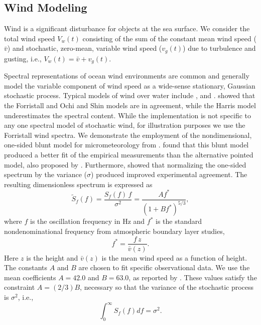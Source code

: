 \documentclass[utf8]{frontiersSCNS} %
\begin{document}
\subsection{Wind Modeling}\label{s:wind_model}
Wind is a significant disturbance for objects at the sea surface. We consider the total wind speed $V_w(t)$ consisting of the sum of the constant mean wind speed ($\bar{v}$) and stochastic, zero-mean, variable wind speed ($v_g(t)$) due to turbulence and gusting, i.e., $V_w(t)=\bar{v}+v_g(t)$.

Spectral representations of ocean wind environments are common and generally model the variable component of wind speed as a wide-sense stationary, Gaussian stochastic process.  Typical models of wind over water include \citet{harris71nature}, \citet{forristall88wind} and \citet{ochi13wind}. \citet{cole18reactive} showed that the Forristall and Ochi and Shin models are in agreement, while the Harris model underestimates the spectral content.  While the implementation is not specific to any one spectral model of stochastic wind, for illustration purposes we use the Forristall wind spectra.  \color{blue}We demonstrate the employment of the nondimensional, one-sided blunt model for micrometeorology from \citet{olesen84modelling}.  \citet{forristall88wind} found that this blunt model produced a better fit of the empirical measurements than the alternative pointed model, also proposed by \citet{olesen84modelling}.  Furthermore, \citet{forristall88wind} showed that normalizing the one-sided spectrum by the variance ($\sigma$) produced improved experimental agreement.  The resulting dimensionless spectrum is expressed as 
\begin{equation}
  \widetilde{S}_f(f) = \frac{S_f(f)\,f}{\sigma^2}  = \frac{ A f^*}{( 1 + B f^*)^{5/3}},
    \label{e:forristall}
    \end{equation}
\color{black}where $f$ is the oscillation frequency in \unit[]{Hz} and $f^*$ is the standard nondenominational frequency from atmospheric boundary layer studies,
\begin{equation}
  f^* = \frac{f \, z}{\bar{v}(z)}.
\end{equation}
Here $z$ is the height and $\bar{v}(z)$ is the mean wind speed as a function of height. The constants $A$ and $B$ are chosen to fit specific observational data.  We use the mean coefficients $A=42.0$ and $B=63.0$, as reported by \citet{forristall88wind}.  These values satisfy the constraint $A=(2/3)B$, necessary so that the variance of the stochastic process is $\sigma^2$, i.e.,
\begin{equation}
  \int_0^{\infty} S_f(f) df = \sigma^2.
\end{equation}
\end{document}
